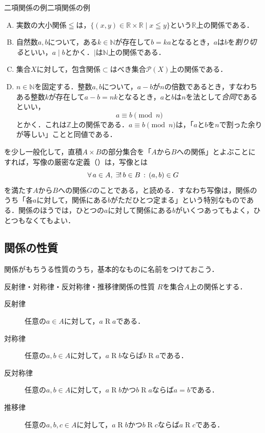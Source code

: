 \begin{example}{二項関係の例}{二項関係の例}
  \begin{enumerate}[(A)]
    \item 実数の大小関係$\leqq$は，$\{ (x, y) \in \mathbb{R} \times \mathbb{R} \mid x \leqq y \}$という$\mathbb{R}$上の関係である．
    \item 自然数$a,b$について，ある$k \in \mathbb{N}$が存在して$b = ka$となるとき，$a$は$b$を\emph{割り切る}といい，$a \mid b$とかく．$\mid$は$\mathbb{N}$上の関係である．
    \item 集合$X$に対して，包含関係$\subset$はべき集合$\mathcal{P}(X)$上の関係である．
    \item $n \in \mathbb{N}$を固定する．整数$a,b$について，$a - b$が$n$の倍数であるとき，すなわちある整数$k$が存在して$a - b = nk$となるとき，$a$と$b$は$n$を法として\emph{合同}であるといい，
          \[
            a \equiv b \pmod{n}
          \]
          とかく．これは$\mathbb{Z}$上の関係である．$a \equiv b \pmod{n}$は，「$a$と$b$を$n$で割った余りが等しい」ことと同値である．
  \end{enumerate}
\end{example}

\begin{remark}[関係と写像]
  を少し一般化して，直積$A \times B$の部分集合を「$A$から$B$への関係」とよぶことにすれば，写像の厳密な定義（）は，写像とは
  \[
    \forall\, a \in A ,\; \exists!\, b \in B \,:\, (a, b) \in G
  \]
  を満たす$A$から$B$への関係$G$のことである，と読める．すなわち写像は，関係のうち「各$a$に対して，関係にある$b$がただひとつ定まる」という特別なものである．関係のほうでは，ひとつの$a$に対して関係にある$b$がいくつあってもよく，ひとつもなくてもよい．
\end{remark}

\subsection{関係の性質}

関係がもちうる性質のうち，基本的なものに名前をつけておこう．

\begin{definition}{反射律・対称律・反対称律・推移律}{関係の性質}
  $R$を集合$A$上の関係とする．
  \begin{description}
    \item[反射律]
          任意の$a \in A$に対して，$a \mathrel{R} a$である．
    \item[対称律]
          任意の$a, b \in A$に対して，$a \mathrel{R} b$ならば$b \mathrel{R} a$である．
    \item[反対称律]
          任意の$a, b \in A$に対して，$a \mathrel{R} b$かつ$b \mathrel{R} a$ならば$a = b$である．
    \item[推移律]
          任意の$a, b, c \in A$に対して，$a \mathrel{R} b$かつ$b \mathrel{R} c$ならば$a \mathrel{R} c$である．
  \end{description}
\end{definition}

